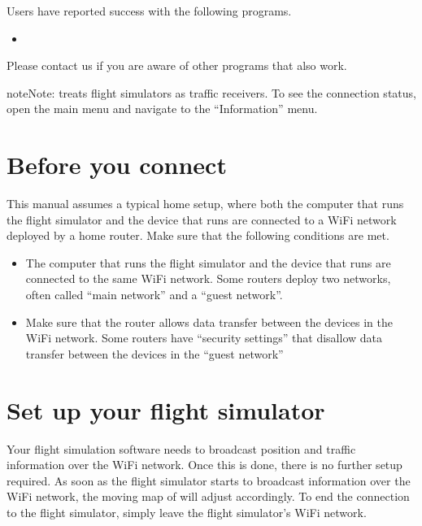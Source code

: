 \documentclass[letterpaper,10pt,english]{sphinxmanual}
\begin{document}
\sphinxAtStartPar
Users have reported success with the following programs.
\begin{itemize}
\item {} 
\sphinxAtStartPar
{}%
\begin{footnote}[16]\sphinxAtStartFootnote
{}
%
\end{footnote}

\end{itemize}

\sphinxAtStartPar
Please contact us if you are aware of other programs that also work.

\begin{sphinxadmonition}{note}{Note:}
\sphinxAtStartPar
{} treats flight simulators as traffic
receivers.  To see the connection status, open the main menu and navigate to
the “Information” menu.
\end{sphinxadmonition}


\section{Before you connect}
\label{\detokenize{02-steps/simulator:before-you-connect}}
\sphinxAtStartPar
This manual assumes a typical home setup, where both the computer that runs the
flight simulator and the device that runs  are
connected to a Wi\sphinxhyphen{}Fi network deployed by a home router.  Make sure that the
following conditions are met.
\begin{itemize}
\item {} 
\sphinxAtStartPar
The computer that runs the flight simulator and the device that runs  are connected to the same Wi\sphinxhyphen{}Fi network.  Some routers
deploy two networks, often called “main network” and a “guest network”.

\item {} 
\sphinxAtStartPar
Make sure that the router allows data transfer between the devices in the
Wi\sphinxhyphen{}Fi network.  Some routers have “security settings” that disallow data
transfer between the devices in the “guest network”

\end{itemize}


\section{Set up your flight simulator}
\label{\detokenize{02-steps/simulator:set-up-your-flight-simulator}}
\sphinxAtStartPar
Your flight simulation software needs to broadcast position and traffic
information over the Wi\sphinxhyphen{}Fi network.  Once this is done, there is no further
setup required.  As soon as the flight simulator starts to broadcast information
over the Wi\sphinxhyphen{}Fi network, the moving map of  will
adjust accordingly.  To end the connection to the flight simulator, simply leave
the flight simulator’s Wi\sphinxhyphen{}Fi network.
\end{document}
